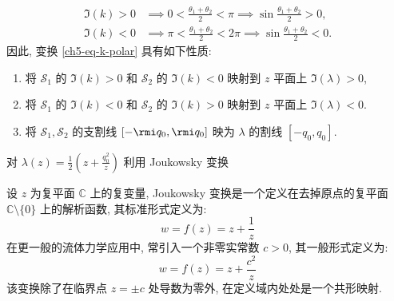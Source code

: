\begin{align}
    \Im(k) > 0 & \implies 0 < \frac{\theta_{1} + \theta_{2}}{2} < \pi \implies \sin{\frac{\theta_{1}+\theta_{2}}{2}} > 0,    \\
    \Im(k) < 0 & \implies \pi < \frac{\theta_{1} + \theta_{2}}{2} < 2\pi \implies \sin{\frac{\theta_{1}+\theta_{2}}{2}} < 0.
\end{align}
因此, 变换 \eqref{ch5-eq-k-polar} 具有如下性质:
\begin{enumerate}
    \item 将 $\mathcal{S}_{1} $ 的 $ \Im(k)>0 $ 和 $ \mathcal{S}_{2} $ 的 $ \Im(k) < 0 $ 映射到 $ z $ 平面上 $ \Im(\lambda) > 0 $,
    \item 将 $\mathcal{S}_{1} $ 的 $ \Im(k)<0 $ 和 $ \mathcal{S}_{2} $ 的 $ \Im(k) > 0 $ 映射到 $ z $ 平面上 $ \Im(\lambda) < 0 $.
    \item 将 $ \mathcal{S}_{1} , \mathcal{S}_{2} $ 的支割线 $ [-\rmi q_{0}, \rmi q_{0}] $ 映为 $ \lambda $ 的割线 $ [-q_{0}, q_{0}] $.
\end{enumerate}
对 $ \lambda(z) = \frac{1}{2}(z + \frac{q_{0}^{2}}{z}) $ 利用 Joukowsky 变换
\begin{definition}[Joukowsky 变换]
    设 $z$ 为复平面 $\mathbb{C}$ 上的复变量, Joukowsky 变换是一个定义在去掉原点的复平面 $\mathbb{C} \setminus \{0\}$ 上的解析函数, 其标准形式定义为:
    \begin{equation}
        w = f(z) = z + \frac{1}{z}
    \end{equation}
    在更一般的流体力学应用中, 常引入一个非零实常数 $c > 0$, 其一般形式定义为:
    \begin{equation}
        w = f(z) = z + \frac{c^2}{z}
    \end{equation}
    该变换除了在临界点 $z = \pm c$ 处导数为零外, 在定义域内处处是一个共形映射.
\end{definition}
%

